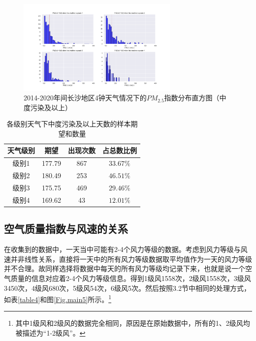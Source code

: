 \documentclass[UTF8,a4paper,10pt]{article}
\begin{document}
\begin{figure}[H] %
\centering %
\includegraphics[width=0.7\textwidth]{..//fig//pm25-weather-serious.png} %
\caption{2014-2020年间长沙地区4钟天气情况下的$PM_{2.5}$指数分布直方图（中度污染及以上）} %
\label{Fig.main4} %
\end{figure}

\begin{table}[]
    \caption{各级别天气下中度污染及以上天数的样本期望和数量}
    \vspace{20pt}
    \centering
    \begin{tabular}{cccc}
        \toprule  %
        天气级别& 期望& 出现次数& 占总数比例\\
        \midrule  %
        级别1& 177.79& 867& $33.67\%$ \\
        级别2& 180.49& 253& $46.51\%$ \\
        级别3& 175.75& 469& $29.46\%$ \\
        级别4& 169.62& 43& $12.01\%$ \\
        \bottomrule %
    \end{tabular}
    \label{table3}
\end{table}

\subsection{空气质量指数与风速的关系}

\indent 在收集到的数据中，一天当中可能有2-4个风力等级的数据。考虑到风力等级与风速并非线性关系，直接将一天中的所有风力等级数据取平均值作为一天的风力等级并不合理。故同样选择将数据中每天的所有风力等级均记录下来，也就是说一个空气质量的信息对应着2-4个风力等级信息。得到1级风1558次，2级风1558次，3级风3450次，4级风680次，5级风54次，6级风5次。然后按照3.2节中相同的处理方式，如表\ref{table4}和图\ref{Fig.main5}所示。\footnote{其中1级风和2级风的数据完全相同，原因是在原始数据中，所有的1、2级风均被描述为“1-2级风”。}
\end{document}
